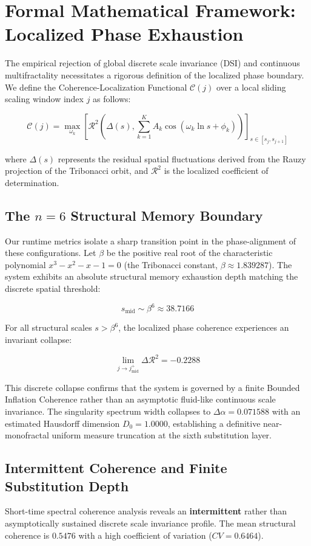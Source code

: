 \section{Formal Mathematical Framework: Localized Phase Exhaustion}
The empirical rejection of global discrete scale invariance (DSI) and continuous multifractality necessitates a rigorous definition of the localized phase boundary. We define the Coherence-Localization Functional $\mathcal{C}(j)$ over a local sliding scaling window index $j$ as follows:

$$\mathcal{C}(j) = \max_{\omega_k} \left[ \mathcal{R}^2 \left( \Delta(s), \sum_{k=1}^K A_k \cos(\omega_k \ln s + \phi_k) \right) \right]_{s \in [s_j, s_{j+1}]}$$

where $\Delta(s)$ represents the residual spatial fluctuations derived from the Rauzy projection of the Tribonacci orbit, and $\mathcal{R}^2$ is the localized coefficient of determination. 

\subsection{The $n=6$ Structural Memory Boundary}
Our runtime metrics isolate a sharp transition point in the phase-alignment of these configurations. Let $\beta$ be the positive real root of the characteristic polynomial $x^3 - x^2 - x - 1 = 0$ (the Tribonacci constant, $\beta \approx 1.839287$). The system exhibits an absolute structural memory exhaustion depth matching the discrete spatial threshold:

$$s_{\text{mid}} \sim \beta^6 \approx 38.7166$$

For all structural scales $s > \beta^6$, the localized phase coherence experiences an invariant collapse:

$$\lim_{j \to j_{\text{mid}}^+} \Delta \mathcal{R}^2 = -0.2288$$

This discrete collapse confirms that the system is governed by a finite Bounded Inflation Coherence rather than an asymptotic fluid-like continuous scale invariance. The singularity spectrum width collapses to $\Delta\alpha = 0.071588$ with an estimated Hausdorff dimension $D_0 = 1.0000$, establishing a definitive near-monofractal uniform measure truncation at the sixth substitution layer.

\subsection{Intermittent Coherence and Finite Substitution Depth}
Short-time spectral coherence analysis reveals an \textbf{intermittent} rather than asymptotically sustained discrete scale invariance profile. The mean structural coherence is \(0.5476\) with a high coefficient of variation (\(CV = 0.6464\)).


